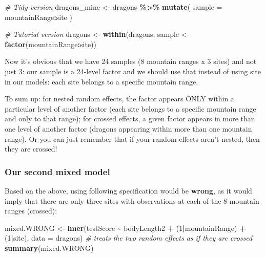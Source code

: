 \documentclass[
]{article}
\newenvironment{Shaded}{\begin{snugshade}}{\end{snugshade}}
\newcommand{\AttributeTok}[1]{\textcolor[rgb]{0.13,0.29,0.53}{#1}}
\newcommand{\CommentTok}[1]{\textcolor[rgb]{0.56,0.35,0.01}{\textit{#1}}}
\newcommand{\DecValTok}[1]{\textcolor[rgb]{0.00,0.00,0.81}{#1}}
\newcommand{\FunctionTok}[1]{\textcolor[rgb]{0.13,0.29,0.53}{\textbf{#1}}}
\newcommand{\NormalTok}[1]{#1}
\newcommand{\OtherTok}[1]{\textcolor[rgb]{0.56,0.35,0.01}{#1}}
\newcommand{\SpecialCharTok}[1]{\textcolor[rgb]{0.81,0.36,0.00}{\textbf{#1}}}
\begin{document}
\begin{Shaded}
\begin{Highlighting}[]
\CommentTok{\# Tidy version}
\NormalTok{dragons\_mine }\OtherTok{\textless{}{-}}\NormalTok{ dragons }\SpecialCharTok{\%\textgreater{}\%} 
  \FunctionTok{mutate}\NormalTok{(}
    \AttributeTok{sample =}\NormalTok{ mountainRange}\SpecialCharTok{:}\NormalTok{site}
\NormalTok{  )}

\CommentTok{\# Tutorial version}
\NormalTok{dragons }\OtherTok{\textless{}{-}} \FunctionTok{within}\NormalTok{(dragons, sample }\OtherTok{\textless{}{-}} \FunctionTok{factor}\NormalTok{(mountainRange}\SpecialCharTok{:}\NormalTok{site))}
\end{Highlighting}
\end{Shaded}

Now it's obvious that we have 24 samples (8 mountain ranges x 3 sites)
and not just 3: our sample is a 24-level factor and we should use that
instead of using site in our models: each site belongs to a specific
mountain range.

To sum up: for nested random effects, the factor appears ONLY within a
particular level of another factor (each site belongs to a specific
mountain range and only to that range); for crossed effects, a given
factor appears in more than one level of another factor (dragons
appearing within more than one mountain range). Or you can just remember
that if your random effects aren't nested, then they are crossed!

\subsubsection{Our second mixed model}\label{our-second-mixed-model}

Based on the above, using following specification would be
\textbf{wrong}, as it would imply that there are only three sites with
observations at each of the 8 mountain ranges (crossed):

\begin{Shaded}
\begin{Highlighting}[]
\NormalTok{mixed.WRONG }\OtherTok{\textless{}{-}} \FunctionTok{lmer}\NormalTok{(testScore }\SpecialCharTok{\textasciitilde{}}\NormalTok{ bodyLength2 }\SpecialCharTok{+}\NormalTok{ (}\DecValTok{1}\SpecialCharTok{|}\NormalTok{mountainRange) }\SpecialCharTok{+}\NormalTok{ (}\DecValTok{1}\SpecialCharTok{|}\NormalTok{site), }\AttributeTok{data =}\NormalTok{ dragons)  }\CommentTok{\# treats the two random effects as if they are crossed}
\FunctionTok{summary}\NormalTok{(mixed.WRONG)}
\end{Highlighting}
\end{Shaded}
\end{document}
